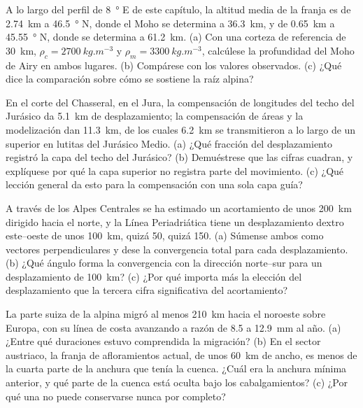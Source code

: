 \begin{exercise}[$\star\star$]\label{exo:b2:alpine-orogen:9}
A lo largo del perfil de \qty{8}{\degree} E de este capítulo, la altitud media de la franja es de
\qty{2.74}{km} a \qty{46.5}{\degree} N, donde el Moho se determina a \qty{36.3}{km}, y de
\qty{0.65}{km} a \qty{45.55}{\degree} N, donde se determina a \qty{61.2}{km}. (a) Con una
corteza de referencia de \qty{30}{km}, $\rho_c = \qty{2700}{kg.m^{-3}}$ y $\rho_m =
\qty{3300}{kg.m^{-3}}$, calcúlese la profundidad del Moho de Airy en ambos lugares. (b) Compárese con los
valores observados. (c) ¿Qué dice la comparación sobre cómo se sostiene la raíz alpina?
\end{exercise}

\begin{exercise}[$\star\star\star$]\label{exo:b2:alpine-orogen:10}
En el corte del Chasseral, en el Jura, la compensación de longitudes del techo del Jurásico
da \qty{5.1}{km} de desplazamiento; la compensación de áreas y la modelización dan \qty{11.3}{km}, de
los cuales \qty{6.2}{km} se transmitieron a lo largo de un  superior en lutitas del Jurásico Medio.
(a) ¿Qué fracción del desplazamiento registró la capa del techo del Jurásico? (b) Demuéstrese que las
cifras cuadran, y explíquese por qué la capa superior no registra parte del movimiento. (c) ¿Qué
lección general da esto para la compensación con una sola capa guía?
\end{exercise}

\begin{exercise}[$\star\star\star$]\label{exo:b2:alpine-orogen:11}
A través de los Alpes Centrales se ha estimado un acortamiento de unos \qty{200}{km} dirigido hacia el norte,
y la Línea Periadriática tiene un desplazamiento dextro este--oeste de unos
\qty{100}{km}, quizá 50, quizá 150. (a) Súmense ambos como vectores perpendiculares y dese
la convergencia total para cada desplazamiento. (b) ¿Qué ángulo forma la convergencia con la
dirección norte--sur para un desplazamiento de \qty{100}{km}? (c) ¿Por qué importa más la elección del desplazamiento
que la tercera cifra significativa del acortamiento?
\end{exercise}

\begin{exercise}[$\star\star\star$]\label{exo:b2:alpine-orogen:12}
La parte suiza de la  alpina migró al menos \qty{210}{km} hacia el noroeste
sobre Europa, con su línea de costa avanzando a razón de 8.5 a \qty{12.9}{mm} al año. (a) ¿Entre qué
duraciones estuvo comprendida la migración? (b) En el sector austriaco, la franja de afloramientos actual,
de unos \qty{60}{km} de ancho, es menos de la cuarta parte de la anchura que tenía la cuenca. ¿Cuál era la
anchura mínima anterior, y qué parte de la cuenca está oculta bajo los cabalgamientos? (c) ¿Por qué una
 no puede conservarse nunca por completo?
\end{exercise}

